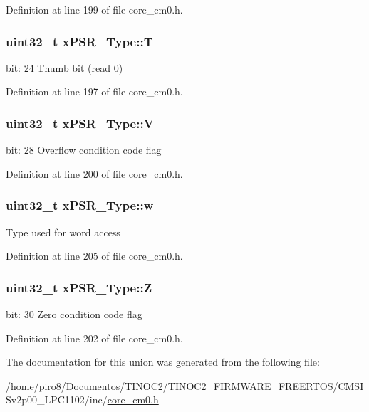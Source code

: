 Definition at line 199 of file core\+\_\+cm0.\+h.

\subsubsection[{\texorpdfstring{T}{T}}]{\setlength{\rightskip}{0pt plus 5cm}uint32\+\_\+t x\+P\+S\+R\+\_\+\+Type\+::T}\hypertarget{unionx_p_s_r___type_a7eed9fe24ae8d354cd76ae1c1110a658}{}\label{unionx_p_s_r___type_a7eed9fe24ae8d354cd76ae1c1110a658}
bit\+: 24 Thumb bit (read 0) 

Definition at line 197 of file core\+\_\+cm0.\+h.

\subsubsection[{\texorpdfstring{V}{V}}]{\setlength{\rightskip}{0pt plus 5cm}uint32\+\_\+t x\+P\+S\+R\+\_\+\+Type\+::V}\hypertarget{unionx_p_s_r___type_af14df16ea0690070c45b95f2116b7a0a}{}\label{unionx_p_s_r___type_af14df16ea0690070c45b95f2116b7a0a}
bit\+: 28 Overflow condition code flag 

Definition at line 200 of file core\+\_\+cm0.\+h.

\subsubsection[{\texorpdfstring{w}{w}}]{\setlength{\rightskip}{0pt plus 5cm}uint32\+\_\+t x\+P\+S\+R\+\_\+\+Type\+::w}\hypertarget{unionx_p_s_r___type_a1a47176768f45f79076c4f5b1b534bc2}{}\label{unionx_p_s_r___type_a1a47176768f45f79076c4f5b1b534bc2}
Type used for word access 

Definition at line 205 of file core\+\_\+cm0.\+h.

\subsubsection[{\texorpdfstring{Z}{Z}}]{\setlength{\rightskip}{0pt plus 5cm}uint32\+\_\+t x\+P\+S\+R\+\_\+\+Type\+::Z}\hypertarget{unionx_p_s_r___type_a1e5d9801013d5146f2e02d9b7b3da562}{}\label{unionx_p_s_r___type_a1e5d9801013d5146f2e02d9b7b3da562}
bit\+: 30 Zero condition code flag 

Definition at line 202 of file core\+\_\+cm0.\+h.



The documentation for this union was generated from the following file\+:\begin{DoxyCompactItemize}
\item 
/home/piro8/\+Documentos/\+T\+I\+N\+O\+C2/\+T\+I\+N\+O\+C2\+\_\+\+F\+I\+R\+M\+W\+A\+R\+E\+\_\+\+F\+R\+E\+E\+R\+T\+O\+S/\+C\+M\+S\+I\+Sv2p00\+\_\+\+L\+P\+C1102/inc/\hyperlink{core__cm0_8h}{core\+\_\+cm0.\+h}\end{DoxyCompactItemize}
